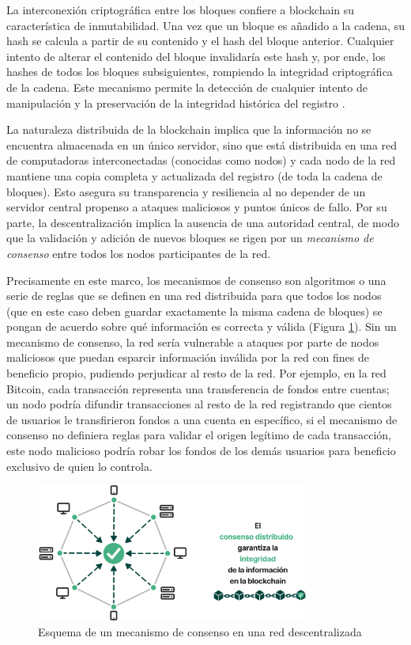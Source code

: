 La interconexión criptográfica entre los bloques confiere a blockchain su característica de inmutabilidad. Una vez que un bloque es añadido a la cadena, su hash se calcula a partir de su contenido y el hash del bloque anterior. Cualquier intento de alterar el contenido del bloque invalidaría este hash y, por ende, los hashes de todos los bloques subsiguientes, rompiendo la integridad criptográfica de la cadena. Este mecanismo permite la detección de cualquier intento de manipulación y la preservación de la integridad histórica del registro \cite{bulkowska2023implementation}. 

La naturaleza distribuida de la blockchain implica que la información no se encuentra almacenada en un único servidor, sino que está distribuida en una red de computadoras interconectadas (conocidas como nodos) y cada nodo de la red mantiene una copia completa y actualizada del registro (de toda la cadena de bloques). Esto asegura su transparencia y resiliencia al no depender de un servidor central \cite{bulkowska2023implementation} propenso a ataques maliciosos y puntos únicos de fallo. Por su parte, la descentralización implica la ausencia de una autoridad central, de modo que la validación y adición de nuevos bloques se rigen por un \textit{mecanismo de consenso} entre todos los nodos participantes de la red. 

Precisamente en este marco, los mecanismos de consenso son algoritmos o una serie de reglas que se definen en una red distribuida para que todos los nodos (que en este caso deben guardar exactamente la misma cadena de bloques) se pongan de acuerdo sobre qué información es correcta y válida (Figura \ref{fig:decentralized-consensus}). Sin un mecanismo de consenso, la red sería vulnerable a ataques por parte de nodos maliciosos que puedan esparcir información inválida por la red con fines de beneficio propio, pudiendo perjudicar al resto de la red. Por ejemplo, en la red Bitcoin, cada transacción representa una transferencia de fondos entre cuentas; un nodo podría difundir transacciones al resto de la red registrando que cientos de usuarios le transfirieron fondos a una cuenta en específico, si el mecanismo de consenso no definiera reglas para validar el origen legítimo de cada transacción, este nodo malicioso podría robar los fondos de los demás usuarios para beneficio exclusivo de quien lo controla.

\begin{figure}[!htb]
    \centering
    \includegraphics[width=0.8\textwidth]{Figures/decentralized-consensus.png}
    \caption{Esquema de un mecanismo de consenso en una red descentralizada}
    \label{fig:decentralized-consensus}
\end{figure}

